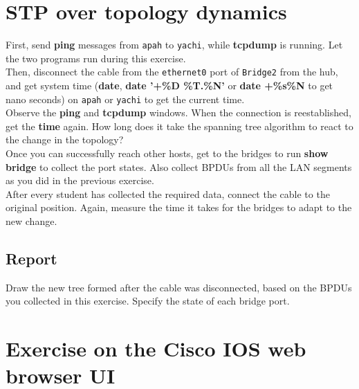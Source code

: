 \documentclass{../UTNetLab}
\begin{document}
\section{STP over topology dynamics}
    First, send \textbf{ping} messages from \texttt{apah} to \texttt{yachi}, while \textbf{tcpdump} is running.
    Let the two programs run during this exercise. \\
    Then, disconnect the cable from the \texttt{ethernet0} port of \texttt{Bridge2} from the hub, and get system time (\textbf{date}, \textbf{date '+\%D \%T.\%N'} or \textbf{date +\%s\%N} to get nano seconds) on \texttt{apah} or \texttt{yachi} to get the current time. \\
    Observe the \textbf{ping} and \textbf{tcpdump} windows. When the connection is reestablished, get the \textbf{time} again. How long does it take the spanning tree algorithm to react to the change in the topology? \\
    Once you can successfully reach other hosts, get to the bridges to run \textbf{show bridge} to collect the port states. Also collect BPDUs from all the LAN segments as you did in the previous exercise. \\
    After every student has collected the required data, connect the cable to the original position. Again, measure the time it takes for the bridges to adapt to the new change.
    \subsection*{Report}
    Draw the new tree formed after the cable was disconnected, based on the BPDUs you collected in this exercise. Specify the state of each bridge port.

    \section*{Exercise on the Cisco IOS web browser UI}
\end{document}

